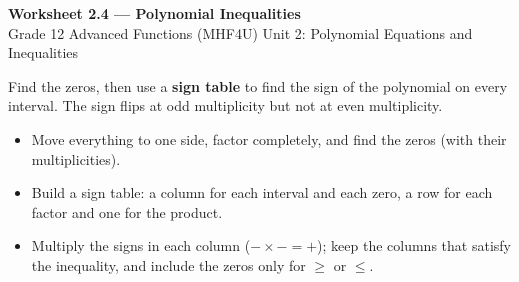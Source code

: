 \documentclass[11pt]{article}
\begin{document}
\begin{center}
{\LARGE\bfseries\color{titleblue}Worksheet 2.4 --- Polynomial Inequalities}\\[2pt]
{\small Grade 12 Advanced Functions (MHF4U) \textperiodcentered{} Unit 2: Polynomial Equations and Inequalities}
\end{center}

\begin{ideabox}
Find the zeros, then use a \textbf{sign table} to find the sign of the polynomial on every interval. The sign flips at odd multiplicity but not at even multiplicity.
\begin{itemize}[leftmargin=*,itemsep=2pt]
  \item Move everything to one side, factor completely, and find the zeros (with their multiplicities).
  \item Build a sign table: a column for each interval and each zero, a row for each factor and one for the product.
  \item Multiply the signs in each column ($-\times-=+$); keep the columns that satisfy the inequality, and include the zeros only for $\ge$ or $\le$.
\end{itemize}
\end{ideabox}
\end{document}
